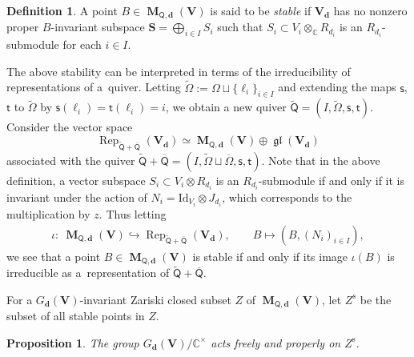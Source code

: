 \documentclass[pdftex]{sigma}
\numberwithin{equation}{section}
\newtheorem{Proposition}[Theorem]{Proposition}
\theoremstyle{definition}
\newtheorem{Definition}[Theorem]{Definition}
\newcommand{\C}{\mathbb{C}} %
\newcommand{\gl}{\operatorname{\mathfrak{gl}}}
\newcommand{\unit}{\mathrm{Id}}
\newcommand{\Rep}{\operatorname{Rep}}
\newcommand{\bM}{\operatorname{\mathbf{M}}}
\newcommand{\bV}{\mathbf{V}}
\newcommand{\bS}{\mathbf{S}}
\newcommand{\ov}{\overline}
\newcommand{\ved}{\mathbf{d}}
\newcommand{\st}{\mathrm{s}}
\newcommand{\vin}{\mathsf{t}} %
\newcommand{\vout}{\mathsf{s}} %
\newcommand{\QQ}{\mathsf{Q}} %
\begin{document}
\begin{Definition}\label{dfn:conf-stable}
A point $B \in \bM_{\QQ,\ved}(\bV)$
is said to be {\em stable} if
$\bV_\ved$ has no nonzero proper $B$-invariant subspace
$\bS=\bigoplus_{i \in I} S_i$ such that
$S_i \subset V_i \otimes_\C R_{d_i}$
is an $R_{d_i}$-submodule for each $i \in I$.
\end{Definition}

The above stability can be interpreted in terms of
the irreducibility of representations of a~quiver.
Letting $\widetilde{\Omega} := \Omega \sqcup \{ \ell_i \}_{i \in I}$
and extending the maps $\vout$, $\vin$ to $\widetilde{\Omega}$
by $\vout(\ell_i)=\vin(\ell_i)=i$,
we obtain a new quiver
$\widetilde{\QQ}=(I,\widetilde{\Omega},\vout,\vin)$.
Consider the vector space
\[
\Rep_{\widetilde{\QQ}+\ov{\QQ}}(\bV_\ved)
\simeq \bM_{\QQ,\ved}(\bV) \oplus \gl(\bV_\ved)
\]
associated with the quiver
$\widetilde{\QQ}+\ov{\QQ}=(I,\widetilde{\Omega}\sqcup \ov{\Omega},\vout,\vin)$.
Note that in the above def\/inition,
a vector subspace $S_i \subset V_i \otimes R_{d_i}$
is an $R_{d_i}$-submodule
if and only if it is invariant under the action of
$N_i=\unit_{V_i} \otimes J_{d_i}$,
which corresponds to the multiplication by $z$.
Thus letting
\begin{gather}\label{eq:embed}
\iota \colon \ \bM_{\QQ,\ved}(\bV) \hookrightarrow
\Rep_{\widetilde{\QQ}+\ov{\QQ}}(\bV_\ved), \qquad
B \mapsto (B, (N_i)_{i \in I}),
\end{gather}
we see that a point $B \in \bM_{\QQ,\ved}(\bV)$ is
stable if and only if its image $\iota(B)$
is irreducible as a~representation of $\widetilde{\QQ}+\ov{\QQ}$.

For a $G_\ved(\bV)$-invariant Zariski closed subset $Z$ of
$\bM_{\QQ,\ved}(\bV)$,
let $Z^\st$ be the subset of all stable points in $Z$.

\begin{Proposition}
The group $G_\ved(\bV)/\C^\times$ acts
freely and properly on $Z^\st$.
\end{Proposition}
\end{document}
